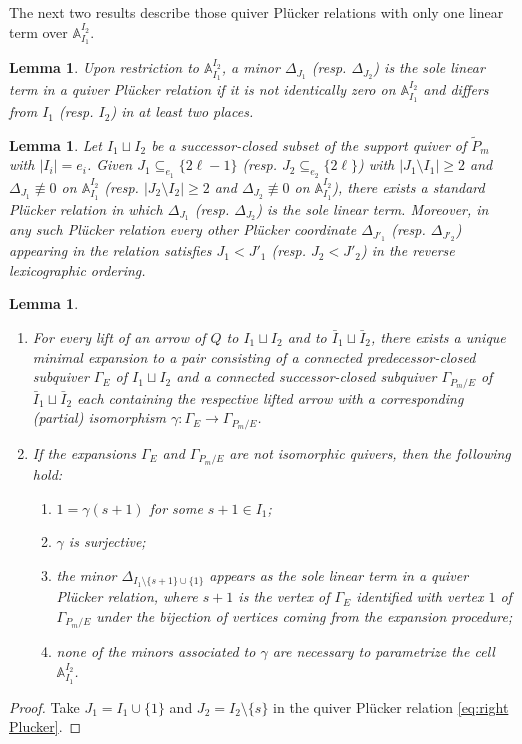 \documentclass{amsart}
\newtheorem{lemma}[theorem]{Lemma}
\numberwithin{equation}{section}
\renewcommand{\AA}{\mathbb{A}}
\begin{document}
  The next two results describe those quiver Pl\"ucker relations with only one linear term over $\AA_{I_1}^{I_2}$.
  \begin{lemma}
    Upon restriction to $\AA_{I_1}^{I_2}$, a minor $\Delta_{J_1}$ (resp. $\Delta_{J_2}$) is the sole linear term in a quiver Pl\"ucker relation if it is not identically zero on $\AA_{I_1}^{I_2}$ and differs from $I_1$ (resp. $I_2$) in at least two places.
  \end{lemma}

  \begin{lemma}
    Let $I_1\sqcup I_2$ be a successor-closed subset of the support quiver of $\tilde P_m$ with $|I_i|=e_i$.
    Given $J_1 \subseteq_{e_1} \{2\ell-1\}$ (resp. $J_2 \subseteq_{e_2} \{2\ell\}$) with $|J_1\setminus I_1|\ge2$ and $\Delta_{J_1}\not\equiv 0$ on $\AA_{I_1}^{I_2}$ (resp. $|J_2\setminus I_2|\ge 2$ and $\Delta_{J_2}\not\equiv 0$ on $\AA_{I_1}^{I_2}$), there exists a standard Pl\"ucker relation in which $\Delta_{J_1}$ (resp. $\Delta_{J_2}$) is the sole linear term.
    Moreover, in any such Pl\"ucker relation every other Pl\"ucker coordinate $\Delta_{J'_1}$ (resp. $\Delta_{J'_2}$) appearing in the relation satisfies $J_1<J'_1$ (resp. $J_2<J'_2$) in the reverse lexicographic ordering.
  \end{lemma}
  \begin{lemma}
    \mbox{}
    \begin{enumerate}
      \item For every lift of an arrow of $Q$ to $I_1\sqcup I_2$ and to $\bar{I}_1\sqcup \bar{I}_2$, there exists a unique minimal expansion to a pair consisting of a connected predecessor-closed subquiver $\Gamma_E$ of $I_1\sqcup I_2$ and a connected successor-closed subquiver $\Gamma_{P_m/E}$ of $\bar{I}_1\sqcup \bar{I}_2$ each containing the respective lifted arrow with a corresponding (partial) isomorphism $\gamma:\Gamma_E\to\Gamma_{P_m/E}$.
      \item If the expansions $\Gamma_E$ and $\Gamma_{P_m/E}$ are not isomorphic quivers, then the following hold:
        \begin{enumerate}
          \item $1=\gamma(s+1)$ for some $s+1\in I_1$;
          \item $\gamma$ is surjective;
          \item the minor $\Delta_{I_1\setminus\{s+1\}\cup\{1\}}$ appears as the sole linear term in a quiver Pl\"ucker relation, where $s+1$ is the vertex of $\Gamma_E$ identified with vertex $1$ of $\Gamma_{P_m/E}$ under the bijection of vertices coming from the expansion procedure;
          \item none of the minors associated to $\gamma$ are necessary to parametrize the cell $\AA_{I_1}^{I_2}$.
        \end{enumerate}
    \end{enumerate}
  \end{lemma}
  \begin{proof}
    Take $J_1=I_1\cup\{1\}$ and $J_2=I_2\setminus\{s\}$ in the quiver Pl\"ucker relation \eqref{eq:right Plucker}.
  \end{proof}
\end{document}
